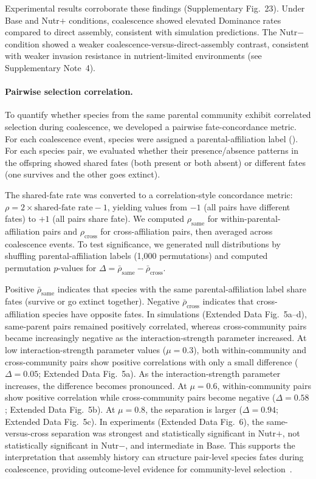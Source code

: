 Experimental results corroborate these findings (Supplementary Fig.~23). Under Base and Nutr$+$ conditions, coalescence showed elevated Dominance rates compared to direct assembly, consistent with simulation predictions. The Nutr$-$ condition showed a weaker coalescence-versus-direct-assembly contrast, consistent with weaker invasion resistance in nutrient-limited environments (see Supplementary Note~4).

\paragraph{Pairwise selection correlation.}
To quantify whether species from the same parental community exhibit correlated selection during coalescence, we developed a pairwise fate-concordance metric. For each coalescence event, species were assigned a parental-affiliation label (). For each species pair, we evaluated whether their presence/absence patterns in the offspring showed shared fates (both present or both absent) or different fates (one survives and the other goes extinct).

The shared-fate rate was converted to a correlation-style concordance metric: $\rho = 2 \times \text{shared-fate rate} - 1$, yielding values from $-1$ (all pairs have different fates) to $+1$ (all pairs share fate). We computed $\rho_{\text{same}}$ for within-parental-affiliation pairs and $\rho_{\text{cross}}$ for cross-affiliation pairs, then averaged across coalescence events. To test significance, we generated null distributions by shuffling parental-affiliation labels (1,000 permutations) and computed permutation $p$-values for $\Delta = \bar{\rho}_{\text{same}} - \bar{\rho}_{\text{cross}}$.

Positive $\bar{\rho}_{\text{same}}$ indicates that species with the same parental-affiliation label share fates (survive or go extinct together). Negative $\bar{\rho}_{\text{cross}}$ indicates that cross-affiliation species have opposite fates. In simulations (Extended Data Fig.~5a--d), same-parent pairs remained positively correlated, whereas cross-community pairs became increasingly negative as the interaction-strength parameter increased. At low interaction-strength parameter values ($\mu = 0.3$), both within-community and cross-community pairs show positive correlations with only a small difference ($\Delta = 0.05$; Extended Data Fig.~5a). As the interaction-strength parameter increases, the difference becomes pronounced. At $\mu = 0.6$, within-community pairs show positive correlation while cross-community pairs become negative ($\Delta = 0.58$; Extended Data Fig.~5b). At $\mu = 0.8$, the separation is larger ($\Delta = 0.94$; Extended Data Fig.~5c). In experiments (Extended Data Fig.~6), the same-versus-cross separation was strongest and statistically significant in Nutr$+$, not statistically significant in Nutr$-$, and intermediate in Base. This supports the interpretation that assembly history can structure pair-level species fates during coalescence, providing outcome-level evidence for community-level selection~\citep{Tikhonov2016,DiazColunga2022,Mansour2018,Rillig2015}.

